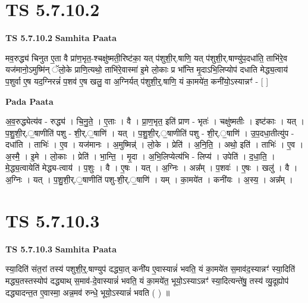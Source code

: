 \documentclass[17pt]{extarticle}
\begin{document}

\section{ TS 5.7.10.2 }

\textbf{TS 5.7.10.2 } \newline
\textbf{Samhita Paata} \newline

मव॒रुद्ध्य॑ चिनुत ए॒ता वै प्रा॑ण॒भृत॒-श्चक्षु॑ष्मती॒रिष्ट॑का॒ यत् प॑शुशी॒र्.षाणि॒ यत् प॑शुशी॒र्.षाण्यु॑प॒दधा॑ति॒ ताभि॑रे॒व यज॑मानो॒ऽमुष्मि॑न् ॅलो॒के प्राणि॒त्यथो॒ ताभि॑रे॒वास्मा॑ इ॒मे लो॒काः प्र भा᳚न्ति मृ॒दाऽभि॒लिप्योप॑ दधाति मेद्ध्य॒त्वाय॑ प॒शुर्वा ए॒ष यद॒ग्निरन्नं॑ प॒शव॑ ए॒ष खलु॒ वा अ॒ग्निर्यत् प॑शुशी॒र्॒.षाणि॒ यं का॒मये॑त॒ कनी॑यो॒ऽस्यान्नꣳ॑ - [  ] \newline

\textbf{Pada Paata} \newline

अ॒व॒रुद्ध्येत्य॑व - रुद्ध्य॑ । चि॒नु॒ते॒ । ए॒ताः । वै । प्रा॒ण॒भृत॒ इति॑ प्राण - भृतः॑ । चक्षु॑ष्मतीः । इष्ट॑काः । यत् । प॒शु॒शी॒र्.॒षाणीति॑ पशु - शी॒र्.॒षाणि॑ । यत् । प॒शु॒शी॒र्.॒षाणीति॑ पशु - शी॒र्.॒षाणि॑ । उ॒प॒दधा॒तीत्यु॑प - दधा॑ति । ताभिः॑ । ए॒व । यज॑मानः । अ॒मुष्मिन्न्॑ । लो॒के । प्रेति॑ । अ॒नि॒ति॒ । अथो॒ इति॑ । ताभिः॑ । ए॒व । अ॒स्मै॒ । इ॒मे । लो॒काः । प्रेति॑ । भा॒न्ति॒ । मृ॒दा । अ॒भि॒लिप्येत्य॑भि - लिप्य॑ । उपेति॑ । द॒धा॒ति॒ । मे॒द्ध्य॒त्वायेति॑ मेद्ध्य-त्वाय॑ । प॒शुः । वै । ए॒षः । यत् । अ॒ग्निः । अन्न᳚म् । प॒शवः॑ । ए॒षः । खलु॑ । वै । अ॒ग्निः । यत् । प॒शु॒शी॒र्.॒षाणीति॑ पशु-शी॒र्.॒षाणि॑ । यम् । का॒मये॑त । कनी॑यः । अ॒स्य॒ । अन्न᳚म् ।  \newline





\section{ TS 5.7.10.3 }

\textbf{TS 5.7.10.3 } \newline
\textbf{Samhita Paata} \newline

स्या॒दिति॑ संत॒रां तस्य॑ पशुशी॒र्॒.षाण्युप॑ दद्ध्या॒त् कनी॑य ए॒वास्यान्नं॑ भवति॒ यं का॒मये॑त स॒माव॑द॒स्यान्नꣳ॑ स्या॒दिति॑ मद्ध्य॒तस्तस्योप॑ दद्ध्याथ् स॒माव॑-दे॒वास्यान्नं॑ भवति॒ यं का॒मये॑त॒ भूयो॒ऽस्याऽन्नꣳ॑ स्या॒दित्यन्ते॑षु॒ तस्य॑ व्यु॒दूह्योप॑ दद्ध्यादन्त॒त ए॒वास्मा॒ अन्न॒मव॑ रुन्धे॒ भूयो॒ऽस्यान्नं॑ भवति ( ) ॥ \newline
\end{document}
